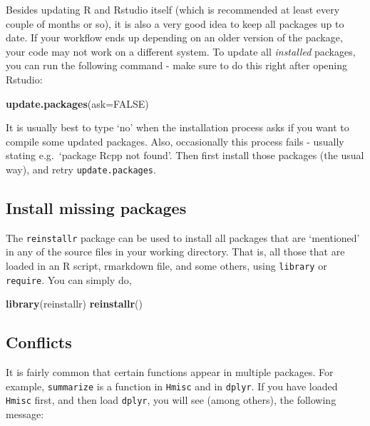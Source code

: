 \documentclass[]{book}
\newenvironment{Shaded}{\begin{snugshade}}{\end{snugshade}}
\newcommand{\DataTypeTok}[1]{\textcolor[rgb]{0.13,0.29,0.53}{#1}}
\newcommand{\KeywordTok}[1]{\textcolor[rgb]{0.13,0.29,0.53}{\textbf{#1}}}
\newcommand{\NormalTok}[1]{#1}
\newcommand{\OtherTok}[1]{\textcolor[rgb]{0.56,0.35,0.01}{#1}}
\begin{document}
Besides updating R and Rstudio itself (which is recommended at least every couple of months or so), it is also a very good idea to keep all packages up to date. If your workflow ends up depending on an older version of the package, your code may not work on a different system. To update all \emph{installed} packages, you can run the following command - make sure to do this right after opening Rstudio:

\begin{Shaded}
\begin{Highlighting}[]
\KeywordTok{update.packages}\NormalTok{(}\DataTypeTok{ask=}\OtherTok{FALSE}\NormalTok{)}
\end{Highlighting}
\end{Shaded}

It is usually best to type `no' when the installation process asks if you want to compile some updated packages. Also, occasionally this process fails - usually stating e.g.~`package Rcpp not found'. Then first install those packages (the usual way), and retry \texttt{update.packages}.

\hypertarget{install-missing-packages}{%
\subsection{Install missing packages}\label{install-missing-packages}}

The \texttt{reinstallr} package can be used to install all packages that are `mentioned' in any of the source files in your working directory. That is, all those that are loaded in an R script, rmarkdown file, and some others, using \texttt{library} or \texttt{require}. You can simply do,

\begin{Shaded}
\begin{Highlighting}[]
\KeywordTok{library}\NormalTok{(reinstallr)}
\KeywordTok{reinstallr}\NormalTok{()}
\end{Highlighting}
\end{Shaded}

\hypertarget{conflicts}{%
\subsection{Conflicts}\label{conflicts}}

It is fairly common that certain functions appear in multiple packages. For example, \texttt{summarize} is a function in \texttt{Hmisc} and in \texttt{dplyr}. If you have loaded \texttt{Hmisc} first, and then load \texttt{dplyr}, you will see (among others), the following message:
\end{document}
